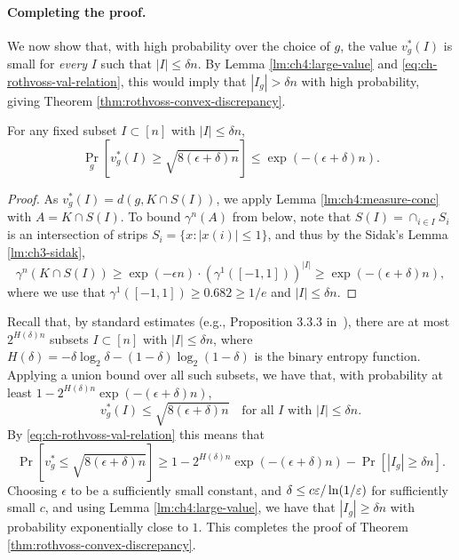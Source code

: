 \paragraph{Completing the proof.}
We now show that, with high probability over the choice of $g$, the value $v^*_g(I)$ is small for {\em every} $I$ such that $|I| \leq \delta n$.
By Lemma \ref{lm:ch4:large-value} and \eqref{eq:ch-rothvoss-val-relation}, this would imply that $|I_g|> \delta n $ with high probability, giving Theorem \ref{thm:rothvoss-convex-discrepancy}.
\begin{lemma}
For any fixed subset $I \subset [n]$ with $|I|\leq \delta n$, 
    \[\Pr_g[ v_g^*(I) \geq \sqrt{8(\epsilon+\delta) n}] \leq \exp(-(\epsilon+ \delta) n)   .\] 
\end{lemma}
\begin{proof}
As $v_g^*(I) = d(g,K\cap S(I))$, we apply Lemma \ref{lm:ch4:measure-conc} with $A= K \cap S(I)$.
To bound  $\gamma^n(A)$ from below, note that  $S(I) = \cap_{i\in I} S_i$ is an intersection of strips $S_i = \{x: |x(i)|\leq 1\}$,  and thus by the Sidak's Lemma \ref{lm:ch3-sidak}, 
   \[\gamma^n(K \cap S(I))  \geq \exp(-\epsilon n) \cdot (\gamma^1([-1,1]))^{|I|} \geq \exp(-(\epsilon+ \delta) n),\]
   where we use that $\gamma^1([-1,1]) \geq 0.682 \geq 1/e$ and $|I|\leq \delta n$. 
\end{proof}
Recall that, by standard estimates (e.g., Proposition 3.3.3 in~\cite{guruswami2012essential}), there are at most $2^{H(\delta)n}$ subsets $I \subset [n]$ with $|I|\leq \delta n$, where $H(\delta) = -\delta \log_2 \delta - (1-\delta)\log_2(1-\delta)$ is the binary entropy function. Applying a union bound over all such subsets, we have that,  with probability at least  $1- 2^{H(\delta) n} \exp(-(\epsilon+\delta)n)$, 
 \[  v^*_g(I) \leq \sqrt{8 (\epsilon + \delta)n} \,\,\,\, \text{ for all $I$ with }  |I|\leq \delta n.\]
%
By \eqref{eq:ch-rothvoss-val-relation} this means that 
\[
\Pr[v_g^* \le \sqrt{8 (\epsilon + \delta)n}]
\ge 
1-2^{H(\delta) n} \exp(-(\epsilon + \delta)n)
- \Pr[|I_g| \ge \delta n].
\]
Choosing $\epsilon$ to be a sufficiently small constant, and $\delta \leq c \varepsilon/ \ln (1/\varepsilon)$ for sufficiently small $c$, and using Lemma \ref{lm:ch4:large-value}, we have that $|I_g| \ge \delta n$ with probability exponentially close to $1$. This completes the proof of Theorem \ref{thm:rothvoss-convex-discrepancy}. 

